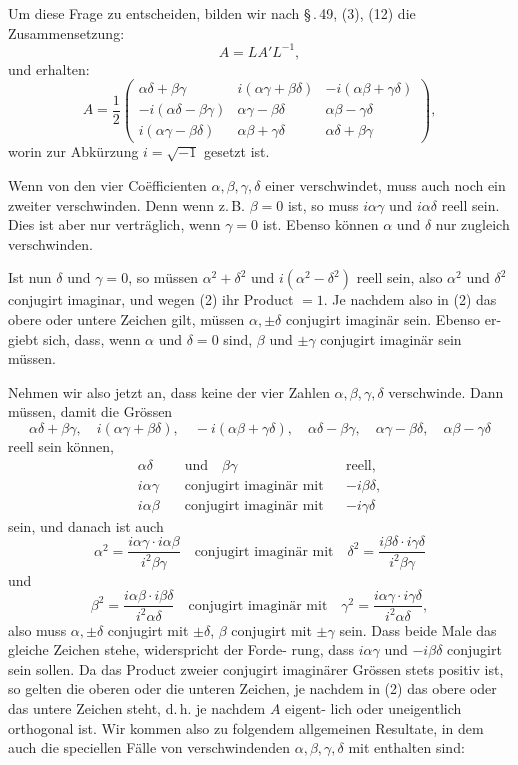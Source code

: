 \documentclass[12pt,a4paper]{article}
\theoremstyle{plain}
\theoremstyle{definition}
\theoremstyle{remark}
\begin{document}
Um diese Frage zu entscheiden, bilden wir nach \S\,.\,49, (3), (12)
die Zusammensetzung:
\[
A = LA'L^{-1},
\]
und erhalten:
\[
A = \frac{1}{2}\begin{pmatrix}
\alpha\delta + \beta\gamma & i(\alpha\gamma + \beta\delta) & -i(\alpha\beta + \gamma\delta)\\
-i(\alpha\delta - \beta\gamma) & \alpha\gamma - \beta\delta & \alpha\beta - \gamma\delta\\
i(\alpha\gamma - \beta\delta) & \alpha\beta + \gamma\delta & \alpha\delta + \beta\gamma
\end{pmatrix},
\]
worin zur Abk\"urzung $i = \sqrt{-1}$ gesetzt ist.

Wenn von den vier Co\"efficienten $\alpha, \beta, \gamma, \delta$ einer verschwindet,
muss auch noch ein zweiter verschwinden. Denn wenn z.\,B.
$\beta = 0$ ist, so muss $i\alpha\gamma$ und $i\alpha\delta$ reell sein. Dies ist aber
nur vertr\"aglich, wenn $\gamma = 0$ ist. Ebenso k\"onnen $\alpha$ und $\delta$ nur
zugleich verschwinden.

Ist nun $\delta$ und $\gamma = 0$, so m\"ussen $\alpha^2 + \delta^2$ und $i(\alpha^2 - \delta^2)$
reell sein, also $\alpha^2$ und $\delta^2$ conjugirt imaginar, und wegen (2) ihr
Product $= 1$. Je nachdem also in (2) das obere oder untere
Zeichen gilt, m\"ussen $\alpha, \pm\delta$ conjugirt imagin\"ar sein. Ebenso er-
giebt sich, dass, wenn $\alpha$ und $\delta = 0$ sind, $\beta$ und $\pm\gamma$ conjugirt
imagin\"ar sein m\"ussen.

Nehmen wir also jetzt an, dass keine der vier Zahlen $\alpha, \beta, \gamma, \delta$
verschwinde. Dann m\"ussen, damit die Gr\"ossen
\[
\alpha\delta + \beta\gamma,\quad i(\alpha\gamma + \beta\delta),\quad -i(\alpha\beta + \gamma\delta),\quad
\alpha\delta - \beta\gamma,\quad \alpha\gamma - \beta\delta,\quad \alpha\beta - \gamma\delta
\]
reell sein k\"onnen,
\begin{align*}
\alpha\delta &\quad\text{und}\quad \beta\gamma &&\text{reell,}\\
i\alpha\gamma &\quad\text{conjugirt imagin\"ar mit}&& -i\beta\delta,\\
i\alpha\beta &\quad\text{conjugirt imagin\"ar mit}&& -i\gamma\delta
\end{align*}
sein, und danach ist auch
\[
\alpha^2 = \frac{i\alpha\gamma \cdot i\alpha\beta}{i^2\beta\gamma}\quad\text{conjugirt imagin\"ar mit}\quad
\delta^2 = \frac{i\beta\delta \cdot i\gamma\delta}{i^2\beta\gamma}
\]
und
\[
\beta^2 = \frac{i\alpha\beta \cdot i\beta\delta}{i^2\alpha\delta}\quad\text{conjugirt imagin\"ar mit}\quad
\gamma^2 = \frac{i\alpha\gamma \cdot i\gamma\delta}{i^2\alpha\delta},
\]
also muss $\alpha, \pm\delta$ conjugirt mit $\pm\delta$, $\beta$ conjugirt mit $\pm\gamma$ sein. Dass
beide Male das gleiche Zeichen stehe, widerspricht der Forde-
rung, dass $i\alpha\gamma$ und $-i\beta\delta$ conjugirt sein sollen. Da das Product
zweier conjugirt imagin\"arer Gr\"ossen stets positiv ist, so gelten
die oberen oder die unteren Zeichen, je nachdem in (2) das
obere oder das untere Zeichen steht, d.\,h. je nachdem $A$ eigent-
lich oder uneigentlich orthogonal ist. Wir kommen also zu
folgendem allgemeinen Resultate, in dem auch die speciellen
F\"alle von verschwindenden $\alpha, \beta, \gamma, \delta$ mit enthalten sind:
\end{document}
